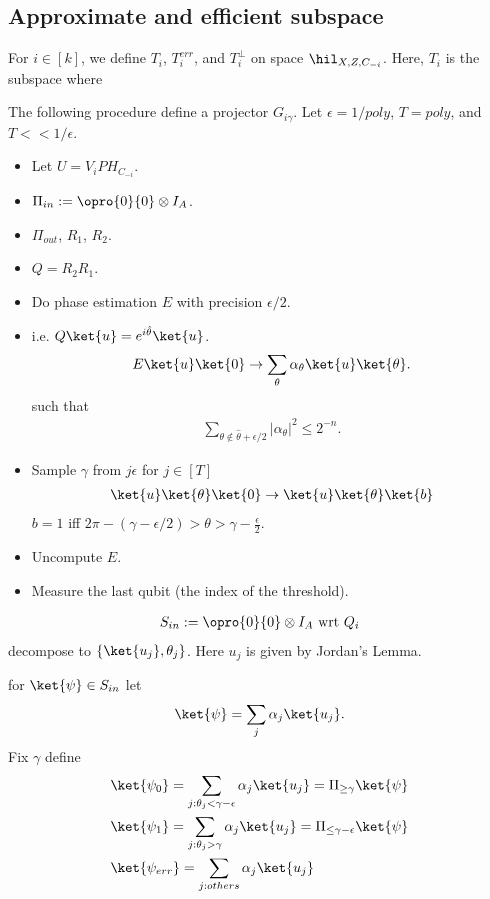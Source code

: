 \subsection{Approximate and efficient subspace}

For $i\in [k]$, we define $T_i$, $T_i^{err}$, and $T_i^{\bot}$ on space $\hil_{X,Z,C_{-i}}$. Here, $T_i$ is the subspace where  


The following procedure define a projector $G_{i\gamma}$. Let $\epsilon = 1/poly$, $T = poly$, and $T << 1/\epsilon$. 
\begin{itemize}
    \item Let $U = V_i P H_{C_{-i}}$. 
    \item $\Pi_{in} := \opro{0}{0}\otimes I_A$. 
    \item $\Pi_{out}$, $R_1$, $R_2$. 
    \item $Q = R_2R_1$. 
    \item Do phase estimation $E$ with precision $\epsilon/2$. 
    \item i.e. $Q\ket{u} = e^{i\hat{\theta}}\ket{u}$. 
    \begin{align*}
        E\ket{u}\ket{0} \rightarrow \sum_{\theta} \alpha_{\theta} \ket{u}\ket{\theta}. 
    \end{align*}
    such that 
    \begin{align*}
        \sum_{\theta\notin \hat{\theta}+\epsilon/2}|\alpha_{\theta}|^2\leq 2^{-n}. 
    \end{align*}
    \item Sample $\gamma$ from $j\epsilon$ for $j\in [T]$
    \begin{align*}
        \ket{u}\ket{\theta}\ket{0} \rightarrow \ket{u}\ket{\theta}\ket{b}
    \end{align*}
    $b=1$ iff $2\pi -(\gamma-\epsilon/2)>\theta>\gamma-\frac{\epsilon}{2}$. 
    \item Uncompute $E$. 
    \item Measure the last qubit (the index of the threshold). 
\end{itemize}

\begin{align*}
    S_{in}:= \opro{0}{0}\otimes I_A \mbox{ wrt }Q_i
\end{align*}
decompose to $\{\ket{u_j}, \theta_j\}$. Here $u_j$ is given by Jordan's Lemma. 

for $\ket{\psi}\in S_{in}$
let 
\begin{align*}
    \ket{\psi} = \sum_{j} \alpha_j \ket{u_j}. 
\end{align*}
Fix $\gamma$ define 
\begin{align*}
    &\ket{\psi_0} = \sum_{j: \theta_j <\gamma-\epsilon} \alpha_j\ket{u_j} = \Pi_{\geq \gamma} \ket{\psi}\\
    &\ket{\psi_1} = \sum_{j: \theta_j >\gamma }\alpha_j\ket{u_j} = \Pi_{\leq \gamma-\epsilon} \ket{\psi} \\
    &\ket{\psi_{err}} = \sum_{j: others} \alpha_j\ket{u_j} 
\end{align*}

